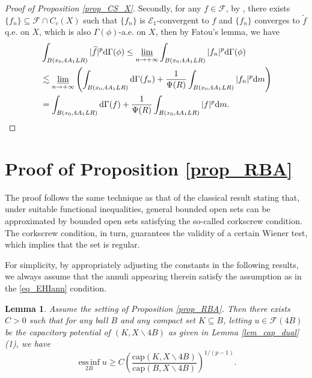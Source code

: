 \documentclass[11pt,a4paper]{article}
\numberwithin{equation}{section}
\newcommand{\einf}{\operatorname*{ess\,inf}}
\theoremstyle{plain}
\newtheorem{lemma}[theorem]{Lemma}
\theoremstyle{definition}
\begin{document}
\begin{proof}[Proof of Proposition \ref{prop_CS_X}]
Secondly, for any $f\in\mathcal{F}$, by \cite[Proposition 8.5, Proposition 8.12]{Yan25a}, there exists $\{f_n\}\subseteq\mathcal{F}\cap C_c(X)$ such that $\{f_n\}$ is $\mathcal{E}_1$-convergent to $f$ and $\{f_n\}$ converges to $\widetilde{f}$ q.e. on $X$, which is also $\Gamma(\phi)$-a.e. on $X$, then by Fatou's lemma, we have
\begin{align*}
&\int_{B(x_0,4A_1LR)}|\widetilde{f}|^p\mathrm{d}\Gamma(\phi)\le\varliminf_{n\to+\infty}\int_{B(x_0,4A_1LR)}|f_n|^p\mathrm{d}\Gamma(\phi)\\
&\lesssim\varliminf_{n\to+\infty}\left(\int_{B(x_0,4A_1LR)}\mathrm{d}\Gamma(f_n)+\frac{1}{\Psi(R)}\int_{B(x_0,4A_1LR)}|f_n|^p\mathrm{d} m\right)\\
&=\int_{B(x_0,4A_1LR)}\mathrm{d}\Gamma(f)+\frac{1}{\Psi(R)}\int_{B(x_0,4A_1LR)}|f|^p\mathrm{d} m.
\end{align*}
\end{proof}

\section{Proof of Proposition \ref{prop_RBA}}\label{sec_RBA}

The proof follows the same technique as that of the classical result stating that, under suitable functional inequalities, general bounded open sets can be approximated by bounded open sets satisfying the so-called corkscrew condition. The corkscrew condition, in turn, guarantees the validity of a certain Wiener test, which implies that the set is regular.

For simplicity, by appropriately adjusting the constants in the following results, we always assume that the annuli appearing therein satisfy the assumption as in the \ref{eq_EHIann} condition.

\begin{lemma}\label{lem_Wiener1}
Assume the setting of Proposition \ref{prop_RBA}. Then there exists $C>0$ such that for any ball $B$ and any compact set $K\subseteq B$, letting $u\in \mathcal{F}(4B)$ be the capacitory potential of $(K,X\backslash 4B)$ as given in Lemma \ref{lem_cap_dual} (1), we have
$$\einf_{2B}u\ge {C}\left(\frac{\mathrm{cap}\left(K,X\backslash 4B\right)}{\mathrm{cap}\left(B,X\backslash 4B\right)}\right)^{1/(p-1)}.$$
\end{lemma}
\end{document}
